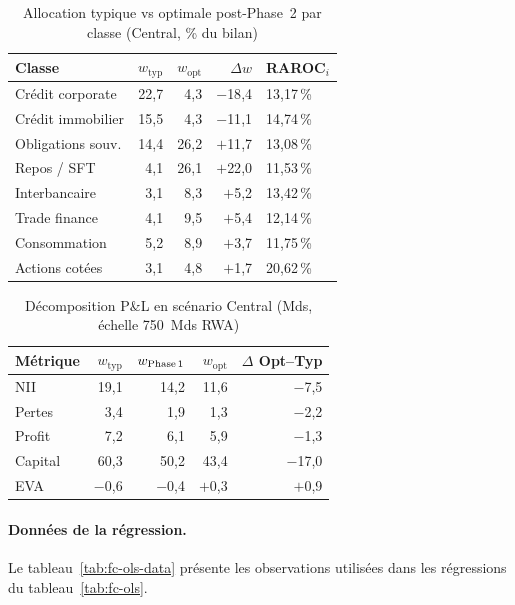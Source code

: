 \documentclass[10pt, a4paper, oneside]{report}
\theoremstyle{definition}
\begin{document}
\begin{table}[htbp]
\centering
\caption{Allocation typique vs optimale post-Phase~2 par classe (Central, \% du bilan)}
\label{tab:fc-alloc}
\small
\begin{tabular}{lrrrl}
\toprule
Classe & $w_{\text{typ}}$ & $w_{\text{opt}}$ & $\Delta w$ & RAROC$_i$ \\
\midrule
Crédit corporate    & 22{,}7 &  4{,}3 & $-$18{,}4 & 13{,}17\,\% \\
Crédit immobilier   & 15{,}5 &  4{,}3 & $-$11{,}1 & 14{,}74\,\% \\
Obligations souv.   & 14{,}4 & 26{,}2 & $+$11{,}7 & 13{,}08\,\% \\
Repos / SFT         &  4{,}1 & 26{,}1 & $+$22{,}0 & 11{,}53\,\% \\
Interbancaire       &  3{,}1 &  8{,}3 & $+$5{,}2  & 13{,}42\,\% \\
Trade finance       &  4{,}1 &  9{,}5 & $+$5{,}4  & 12{,}14\,\% \\
Consommation        &  5{,}2 &  8{,}9 & $+$3{,}7  & 11{,}75\,\% \\
Actions cotées      &  3{,}1 &  4{,}8 & $+$1{,}7  & 20{,}62\,\% \\
\bottomrule
\end{tabular}
\end{table}

\begin{table}[htbp]
\centering
\caption{Décomposition P\&L en scénario Central (Mds\texteuro, échelle 750~Mds RWA)}
\label{tab:fc-pnl}
\small
\begin{tabular}{lrrrr}
\toprule
Métrique & $w_{\text{typ}}$ & $w_{\text{Phase\,1}}$ & $w_{\text{opt}}$ & $\Delta$ Opt--Typ \\
\midrule
NII      & 19{,}1 & 14{,}2 & 11{,}6 & $-$7{,}5 \\
Pertes   &  3{,}4 &  1{,}9 &  1{,}3 & $-$2{,}2 \\
Profit   &  7{,}2 &  6{,}1 &  5{,}9 & $-$1{,}3 \\
Capital  & 60{,}3 & 50{,}2 & 43{,}4 & $-$17{,}0 \\
EVA      & $-$0{,}6 & $-$0{,}4 & $+$0{,}3 & $+$0{,}9 \\
\bottomrule
\end{tabular}
\end{table}

\paragraph{Données de la régression.} Le tableau~\ref{tab:fc-ols-data} présente les observations utilisées dans les régressions du tableau~\ref{tab:fc-ols}.
\end{document}
